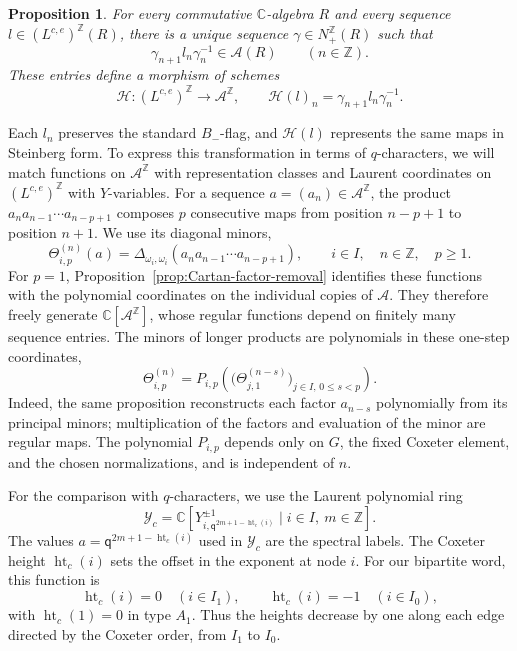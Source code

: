 \documentclass[11pt,leqno]{amsart}
\numberwithin{equation}{section}
\theoremstyle{plain}
\newtheorem{proposition}[theorem]{Proposition}
\theoremstyle{definition}
\theoremstyle{plain}
\theoremstyle{definition}
\theoremstyle{remark}
\newcommand{\qaff}{\mathsf q}
\begin{document}
\begin{proposition}\label{prop:discrete-Miura-transformation}
For every commutative $\mathbb C$-algebra $R$ and every sequence $l\in(L^{c,e})^{\mathbb Z}(R)$, there is a unique sequence $\gamma\in N_+^{\mathbb Z}(R)$ such that
\[
 \gamma_{n+1}l_n\gamma_n^{-1}\in\mathcal A(R)
 \qquad(n\in\mathbb Z).
\]
These entries define a morphism of schemes
\[
 \mathcal H:(L^{c,e})^{\mathbb Z}\longrightarrow\mathcal A^{\mathbb Z},
 \qquad \mathcal H(l)_n=\gamma_{n+1}l_n\gamma_n^{-1}.
\]
\end{proposition}

Each $l_n$ preserves the standard $B_-$-flag, and $\mathcal H(l)$ represents the same maps in Steinberg form.  To express this transformation in terms of $q$-characters, we will match functions on $\mathcal A^{\mathbb Z}$ with representation classes and Laurent coordinates on $(L^{c,e})^{\mathbb Z}$ with $Y$-variables.  For a sequence $a=(a_n)\in\mathcal A^{\mathbb Z}$, the product $a_na_{n-1}\cdots a_{n-p+1}$ composes $p$ consecutive maps from position $n-p+1$ to position $n+1$.  We use its diagonal minors,
\[
 \Theta_{i,p}^{(n)}(a)
 =\Delta_{\omega_i,\omega_i}(a_na_{n-1}\cdots a_{n-p+1}),
 \qquad i\in I,\quad n\in\mathbb Z,\quad p\ge1.
\]
For $p=1$, Proposition~\ref{prop:Cartan-factor-removal} identifies these functions with the polynomial coordinates on the individual copies of $\mathcal A$.  They therefore freely generate $\mathbb C[\mathcal A^{\mathbb Z}]$, whose regular functions depend on finitely many sequence entries.  The minors of longer products are polynomials in these one-step coordinates,
\[
 \Theta_{i,p}^{(n)}
 =P_{i,p}\!\left(
       \bigl(\Theta_{j,1}^{(n-s)}\bigr)_{j\in I,\,0\le s<p}
             \right).
\]
Indeed, the same proposition reconstructs each factor $a_{n-s}$ polynomially from its principal minors; multiplication of the factors and evaluation of the minor are regular maps.  The polynomial $P_{i,p}$ depends only on $G$, the fixed Coxeter element, and the chosen normalizations, and is independent of $n$.

For the comparison with $q$-characters, we use the Laurent polynomial ring
\[
 \mathscr Y_c
 =\mathbb C\!\left[
       Y_{i,\qaff^{2m+1-\operatorname{ht}_c(i)}}^{\pm1}
       \mid i\in I,\ m\in\mathbb Z\right].
\]
The values $a=\qaff^{2m+1-\operatorname{ht}_c(i)}$ used in $\mathscr Y_c$ are the spectral labels.  The Coxeter height $\operatorname{ht}_c(i)$ sets the offset in the exponent at node $i$.  For our bipartite word, this function is
\begin{equation}\label{eq:FL-height-bipartite}
 \operatorname{ht}_c(i)=0\quad(i\in I_1),\qquad
 \operatorname{ht}_c(i)=-1\quad(i\in I_0),
\end{equation}
with $\operatorname{ht}_c(1)=0$ in type $A_1$.  Thus the heights decrease by one along each edge directed by the Coxeter order, from $I_1$ to $I_0$.
\end{document}
